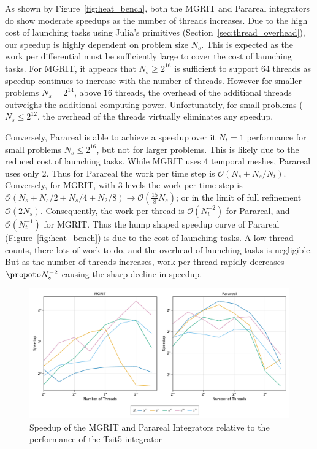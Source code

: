 \documentclass{article}
\begin{document}
As shown by Figure~\ref{fig:heat_bench}, both the MGRIT and Parareal integrators do show moderate speedups as the number of threads increases.
Due to the high cost of launching tasks using Julia's primitives (Section~\ref{sec:thread_overhead}), our speedup is highly dependent on problem size \(N_s\).
This is expected as the work per differential must be sufficiently large to cover the cost of launching tasks.
For MGRIT, it appears that \(N_s \geq 2^{16}\) is sufficient to support 64 threads as speedup continues to increase with the number of threads.
However for smaller problems \(N_s = 2^{14}\), above \~16 threads, the overhead of the additional threads outweighs the additional computing power.
Unfortunately, for small problems (\(N_s \leq 2^{12}\), the overhead of the threads virtually eliminates any speedup.

Conversely, Parareal is able to achieve a speedup over it \(N_t = 1\) performance for small problems \(N_s \leq 2^{16}\), but not for larger problems.
This is likely due to the reduced cost of launching tasks.
While MGRIT uses 4 temporal meshes, Parareal uses only 2.
Thus for Parareal the work per time step is \( \mathcal{O}(N_s + N_s / N_t)\).
Conversely, for MGRIT, with 3 levels the work per time step is  \( \mathcal{O}(N_s + N_s/2 + N_s/4 + N_2/8) \to \mathcal{O}(\frac{15}{8}N_s)\); or in the limit of full refinement \( \mathcal{O}(2 N_s) \).
Consequently, the work per thread is \( \mathcal{O}(N_t^{-2})\) for Parareal, and \( \mathcal{O}(N_t^{-1})\) for MGRIT.
Thus the hump shaped speedup curve of Parareal (Figure~\ref{fig:heat_bench}) is due to the cost of launching tasks.
A low thread counts, there lots of work to do, and the overhead of launching tasks is negligible.
But as the number of threads increases, work per thread rapidly decreases \(\propoto N_s^{-2}\) causing the sharp decline in speedup.

\begin{figure}[h]
    \centering
    \includegraphics[width=\linewidth]{docs/assets/speedup_tsit5.pdf}
    \caption{Speedup of the MGRIT and Parareal Integrators relative to the performance of the Tsit5 integrator}
    \label{fig:heat_bench_tsit5}
\end{figure}
\end{document}
